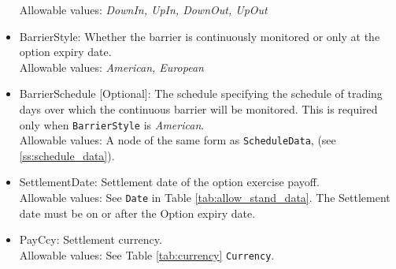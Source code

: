 \begin{itemize}
  Allowable values: \emph{DownIn, UpIn, DownOut, UpOut}
  \item BarrierStyle: Whether the barrier is continuously monitored or only at the option expiry date. \\
  Allowable values: \emph{American, European}
  \item BarrierSchedule [Optional]: The schedule specifying the schedule of trading days over which the continuous
  barrier will be monitored. This is required only when \lstinline!BarrierStyle! is \emph{American}. \\
  Allowable values: A node of the same form as \lstinline!ScheduleData!, (see \ref{ss:schedule_data}).
  \item SettlementDate: Settlement date of the option exercise payoff. \\
  Allowable values: See \lstinline!Date! in Table \ref{tab:allow_stand_data}. The Settlement date must be on or after the Option expiry date.
  \item PayCcy: Settlement currency. \\
  Allowable values: See Table \ref{tab:currency} \lstinline!Currency!.
\end{itemize}

